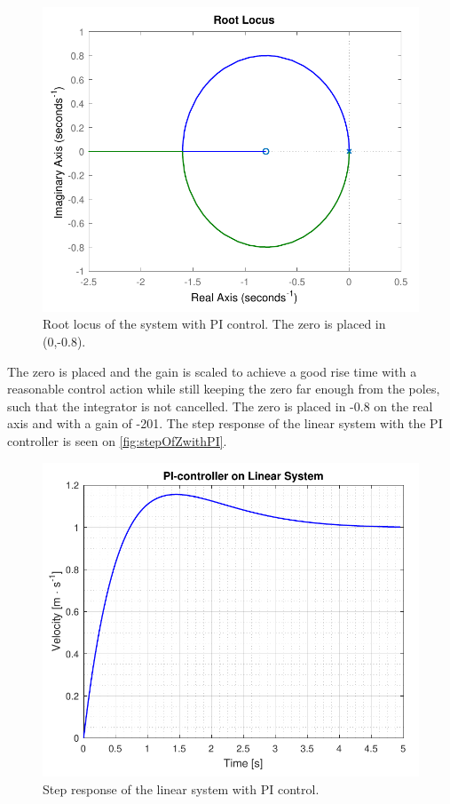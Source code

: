 \begin{figure}[H]
	\centering
	\includegraphics[width=.6\textwidth]{figures/rootLocusOfZwithPI.pdf}
	\caption{Root locus of the system with PI control. The zero is placed in (0,-0.8).}
	\label{fig:rootLocusOfZwithPI}
\end{figure}

The zero is placed and the gain is scaled to achieve a good rise time with a reasonable control action while still keeping the zero far enough from the poles, such that the integrator is not cancelled. The zero is placed in -0.8 on the real axis and with a gain of -201. The step response of the linear system with the PI controller is seen on \autoref{fig:stepOfZwithPI}.

\begin{figure}[H]
	\centering
	\includegraphics[width=.6\textwidth]{figures/stepOfZwithPI.pdf}
	\caption{Step response of the linear system with PI control.}
	\label{fig:stepOfZwithPI}
\end{figure}


